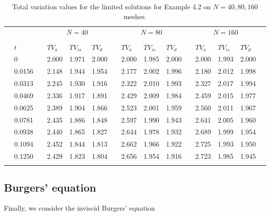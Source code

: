 \documentclass[reqno,a4paper,12pt]{amsart}
\begin{document}
\begin{table}[htb!]
    \centering
    \begin{tabular}{@{}clclllclllclllc@{}}
        \toprule
        & & {} & \multicolumn{3}{c}{$N = 40$} & {} & \multicolumn{3}{c}{$N = 80$} & {} & \multicolumn{3}{c}{$N = 160$} \\
        \cmidrule{4-6} \cmidrule{8-10} \cmidrule{12-14} \\
        & $t$ & {} & $TV_a$ & $TV_{is}$ & $TV_{d}$ & {} & $TV_a$ & $TV_{is}$ & $TV_{d}$ & {} & $TV_a$ & $TV_{is}$ & $TV_{d}$ \\
        \midrule
        & 0      & {} & 2.000 & 1.971 & 2.000 & {} & 2.000 & 1.985 & 2.000 & {} & 2.000 & 1.993 & 2.000 & \\
        & 0.0156 & {} & 2.148 & 1.944 & 1.954 & {} & 2.177 & 2.002 & 1.996 & {} & 2.180 & 2.012 & 1.998 & \\
        & 0.0313 & {} & 2.245 & 1.930 & 1.916 & {} & 2.322 & 2.010 & 1.993 & {} & 2.327 & 2.017 & 1.994 & \\
        & 0.0469 & {} & 2.336 & 1.917 & 1.891 & {} & 2.429 & 2.009 & 1.984 & {} & 2.459 & 2.015 & 1.977 & \\
        & 0.0625 & {} & 2.389 & 1.904 & 1.866 & {} & 2.523 & 2.001 & 1.959 & {} & 2.560 & 2.011 & 1.967 & \\
        & 0.0781 & {} & 2.435 & 1.886 & 1.848 & {} & 2.597 & 1.990 & 1.943 & {} & 2.641 & 2.005 & 1.960 & \\
        & 0.0938 & {} & 2.440 & 1.865 & 1.827 & {} & 2.644 & 1.978 & 1.932 & {} & 2.689 & 1.999 & 1.954 & \\
        & 0.1094 & {} & 2.452 & 1.844 & 1.813 & {} & 2.662 & 1.966 & 1.922 & {} & 2.725 & 1.993 & 1.950 & \\
        & 0.1250 & {} & 2.429 & 1.823 & 1.804 & {} & 2.656 & 1.954 & 1.916 & {} & 2.723 & 1.985 & 1.945 & \\
        \bottomrule\\
    \end{tabular}
    \caption{Total variation values for the limited solutions for Example 4.2 on $N = 40,80,160$ meshes.}
    \label{table:3}
\end{table}

\subsection{Burgers' equation}

Finally, we consider the inviscid Burgers' equation
\end{document}
